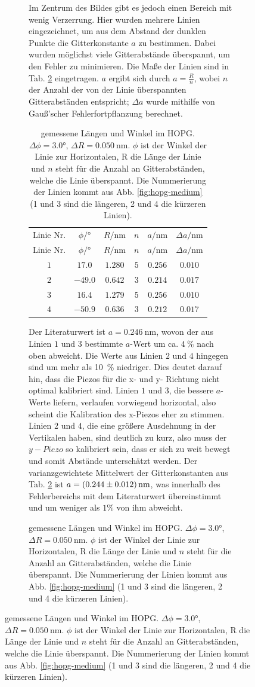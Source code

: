 \documentclass{article}
\begin{document}
\begin{figure}[h]
\begin{figure}[h]
Im Zentrum des Bildes gibt es jedoch einen Bereich mit wenig Verzerrung.
Hier wurden mehrere Linien eingezeichnet, um aus dem Abstand der dunklen Punkte die Gitterkonstante $a$
zu bestimmen. Dabei wurden möglichst viele Gitterabstände überspannt, um den Fehler zu minimieren.
Die Maße der Linien sind in Tab. \ref{tab:hopg-data} eingetragen. $a$ ergibt sich durch $a=\frac{R}{n}$, wobei $n$
der Anzahl der von der Linie überspannten Gitterabständen entspricht;
$\Delta a$ wurde mithilfe von Gauß'scher Fehlerfortpflanzung berechnet.

\begin{table}[h]
    \centering
    \begin{tabular}{c||c|c|c|c|c}
        Linie Nr. & $\phi/\si{\degree}$ & $R/\si{\nm}$ & $n$ & $a/\si{\nm}$ & $\Delta a/\si{\nm}$ \\
        Linie Nr. & $\phi/\si{\degree}$ & $R/\si{\nm}$ & $n$ & $a/\si{\nm}$ & $\Delta a/\si{\nm}$ \\
        \hline
        $1$ & $17.0 $   & $1.280$ & $5$ & $0.256$ & $0.010$ \\
        $2$ & $-49.0$	& $0.642$ & $3$ & $0.214$ & $0.017$ \\
        $3$ & $16.4	$   & $1.279$ & $5$ & $0.256$ & $0.010$ \\
        $4$ & $-50.9$	& $0.636$ & $3$ & $0.212$ & $0.017$
    \end{tabular}
    \caption{gemessene Längen und Winkel im HOPG. $\Delta\phi=\ang{3.0}$, $\Delta R = \SI{0.050}{\nm}$. $\phi$ ist der Winkel der Linie zur Horizontalen, R die Länge der Linie und $n$ steht für die Anzahl an Gitterabständen, welche die Linie überspannt.
    Die Nummerierung der Linien kommt aus Abb. \ref{fig:hopg-medium} (1 und 3 sind die längeren, 2 und 4 die kürzeren Linien).}
    \label{tab:hopg-data}
    \caption{gemessene Längen und Winkel im HOPG. $\Delta\phi=\ang{3.0}$, $\Delta R = \SI{0.050}{\nm}$. $\phi$ ist der Winkel der Linie zur Horizontalen, R die Länge der Linie und $n$ steht für die Anzahl an Gitterabständen, welche die Linie überspannt.
    Die Nummerierung der Linien kommt aus Abb. \ref{fig:hopg-medium} (1 und 3 sind die längeren, 2 und 4 die kürzeren Linien).}
    \label{tab:hopg-data}
\end{table}

Der Literaturwert ist $a=\SI{0.246}{\nm}$, wovon der aus Linien $1$ und $3$ bestimmte $a$-Wert um ca. $\SI{4}{\percent}$
nach oben abweicht. Die Werte aus Linien $2$ und $4$ hingegen sind um mehr als \SI{10}{\percent} niedriger.
Dies deutet darauf hin, dass die Piezos für die x- und y- Richtung nicht optimal kalibriert sind.
Linien $1$ und $3$, die bessere $a$-Werte liefern, verlaufen vorwiegend horizontal, also scheint die Kalibration des x-Piezos
eher zu stimmen. Linien $2$ und $4$, die eine größere Ausdehnung in der Vertikalen haben, sind deutlich zu kurz,
also muss der $y-Piezo$ so kalibriert sein, dass er sich zu weit bewegt und somit Abstände unterschätzt werden.
Der varianzgewichtete Mittelwert der Gitterkonstanten aus Tab. \ref{tab:hopg-data} ist $a = \SI{0.244\pm0.012}{\nm}$,
was innerhalb des Fehlerbereichs mit dem Literaturwert übereinstimmt und um weniger als $1\%$ von ihm abweicht.


\end{figure}
\end{figure}
\end{document}
